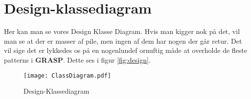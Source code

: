 \section{Design-klassediagram}
Her kan man se vores Design Klasse Diagram. Hvis man kigger nok på det, vil man se at der er masser af pile, men ingen af dem har nogen der går retur. Det vil sige det er lykkedes os på en nogenlundef ornuftig måde at overholde de fleste patterns i \textbf{GRASP}.
Dette ses i figur \vref{fig:design}.
\begin{figure}[!ht]
\centering
\texttt{[image: ClassDiagram.pdf]}
\caption[<Text for the list of figures>]{Design-Klassediagram}
\label{fig:design}
\end{figure}
\newpage